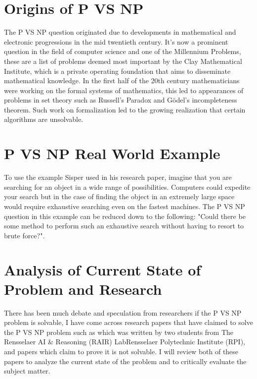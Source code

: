 \documentclass{report}
\begin{document}
\section{Origins of P VS NP}
The P VS NP question originated due to developments in mathematical and electronic progressions in the mid twentieth century\cite{HistoryOfPVsNP}. It's now a prominent question in the field of computer science and one of the Millennium Problems\cite{Millennium}, these are a list of problems deemed most important by the Clay Mathematical Institute, which is a private operating foundation that aims to disseminate mathematical knowledge\cite{AboutMillennium}.  In the first half of the 20th century mathematicians were working on the formal systems of mathematics\cite{ResearchPaperFormalizeMathematics}, this led to appearances of problems in set theory such as Russell's Paradox\cite{RussellParadox} and Gödel's incompleteness theorem\cite{Godel}. Such work on formalization led to the growing realization that certain algorithms are unsolvable\cite{HistoryOfPVsNP}.
\section{P VS NP Real World Example}
To use the example Sisper used in his research paper\cite{HistoryOfPVsNP}, imagine that you are searching for an object in a wide range of possibilities.  Computers could expedite your search but in the case of finding the object in an extremely large space would require exhaustive searching even on the fastest machines.  The P VS NP question in this example can be reduced down to the following: "Could there be some method to perform such an exhaustive search without having to resort to brute force?".
\section{Analysis of Current State of Problem and Research}
There has been much debate and speculation from researchers if the P VS NP problem is solvable, I have come across research papers that have claimed to solve the P VS NP problem such as\cite{PVsNPSolved} which was written by two students from The Rensselaer AI \& Reasoning (RAIR) LabRensselaer Polytechnic Institute (RPI), and papers which claim to prove it is not solvable\cite{P!=NP}. I will review both of these papers to analyze the current state of the problem and to critically evaluate the subject matter.
\end{document}
